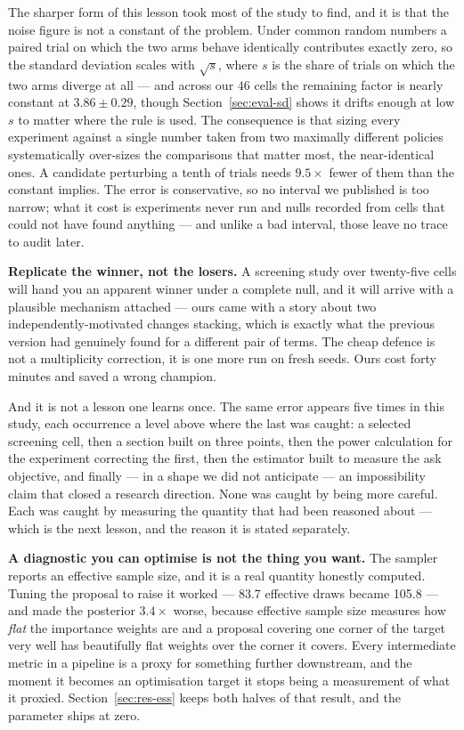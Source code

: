 \documentclass[11pt,a4paper]{article}
\begin{document}
The sharper form of this lesson took most of the study to find, and it is that
the noise figure is not a constant of the problem. Under common random numbers a
paired trial on which the two arms behave identically contributes exactly zero,
so the standard deviation scales with $\sqrt{s}$, where $s$ is the share of
trials on which the two arms diverge at all --- and across our $46$ cells the
remaining factor is nearly constant at $3.86 \pm 0.29$, though
Section~\ref{sec:eval-sd} shows it drifts enough at low $s$ to matter where the
rule is used. The consequence is that
sizing every experiment against a single number taken from two maximally
different policies systematically over-sizes the comparisons that matter most,
the near-identical ones. A candidate perturbing a tenth of trials needs
$9.5\times$ fewer of them than the constant implies. The error is conservative,
so no interval we published is too narrow; what it cost is experiments never run
and nulls recorded from cells that could not have found anything --- and unlike
a bad interval, those leave no trace to audit later.

\textbf{Replicate the winner, not the losers.} A screening study over
twenty-five cells will hand you an apparent winner under a complete null, and it
will arrive with a plausible mechanism attached --- ours came with a story about
two independently-motivated changes stacking, which is exactly what the previous
version had genuinely found for a different pair of terms. The cheap defence is
not a multiplicity correction, it is one more run on fresh seeds. Ours cost forty
minutes and saved a wrong champion.

And it is not a lesson one learns once. The same error appears five times in this
study, each occurrence a level above where the last was caught: a selected
screening cell, then a section built on three points, then the power calculation
for the experiment correcting the first, then the estimator built to measure the
ask objective, and finally --- in a shape we did not anticipate --- an
impossibility claim that closed a research direction. None was caught by being
more careful. Each was caught by measuring the quantity that had been reasoned
about --- which is the next lesson, and the reason it is stated separately.

\textbf{A diagnostic you can optimise is not the thing you want.} The sampler
reports an effective sample size, and it is a real quantity honestly computed.
Tuning the proposal to raise it worked --- 83.7 effective draws became 105.8 ---
and made the posterior $3.4\times$ worse, because effective sample size measures
how \emph{flat} the importance weights are and a proposal covering one corner of
the target very well has beautifully flat weights over the corner it covers.
Every intermediate metric in a pipeline is a proxy for something further
downstream, and the moment it becomes an optimisation target it stops being a
measurement of what it proxied. Section~\ref{sec:res-ess} keeps both halves of
that result, and the parameter ships at zero.
\end{document}
